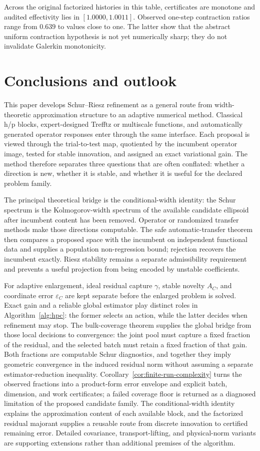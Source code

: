 \documentclass[11pt]{article}
\numberwithin{algorithm}{section}
\theoremstyle{definition}\newtheorem{definition}[theorem]{Definition}
\theoremstyle{remark}\newtheorem{remark}[theorem]{Remark}
\begin{document}
Across the original factorized histories in this table, certificates are monotone and audited effectivity
lies in $[1.0000,1.0011]$.  Observed one-step contraction ratios range from
$0.639$ to values close to one.  The latter show that the abstract uniform
contraction hypothesis is not yet numerically sharp; they do not invalidate
Galerkin monotonicity.
\endsecondarynumericsB

\section{Conclusions and outlook}
This paper develops Schur--Riesz refinement as a general route from
width-theoretic approximation structure to an adaptive numerical method.
Classical h/p blocks, expert-designed Trefftz or multiscale functions, and
automatically generated operator responses enter through the same interface.
Each proposal is viewed through the trial-to-test map, quotiented by the
incumbent operator image, tested for stable innovation, and assigned an exact
variational gain.  The method therefore separates three questions that are
often conflated: whether a direction is new, whether it is stable, and whether
it is useful for the declared problem family.

The principal theoretical bridge is the conditional-width identity: the
Schur spectrum is the Kolmogorov-width spectrum of the available candidate
ellipsoid after incumbent content has been removed.  Operator or randomized
transfer methods make those directions computable.  The safe
automatic-transfer theorem then compares a proposed space with the incumbent
on independent functional data and supplies a population non-regression bound;
rejection recovers the incumbent exactly.  Riesz stability remains a separate
admissibility requirement and prevents a useful projection from being encoded
by unstable coefficients.

For adaptive enlargement, ideal residual capture $\gamma$, stable novelty
$A_C$, and coordinate error $\varepsilon_C$ are kept separate before the
enlarged problem is solved.  Exact gain and a reliable global estimator play
distinct roles in Algorithm~\ref{alg:hpc}: the former selects an action, while
the latter decides when refinement may stop.
The bulk-coverage theorem supplies the global bridge from those local
decisions to convergence: the joint pool must capture a fixed fraction of the
residual, and the selected batch must retain a fixed fraction of that gain.
Both fractions are computable Schur diagnostics, and together they imply
geometric convergence in the induced residual norm without assuming a
separate estimator-reduction inequality.  Corollary~\ref{cor:finite-run-complexity}
turns the observed fractions into a product-form error envelope and explicit
batch, dimension, and work certificates; a failed coverage floor is returned
as a diagnosed limitation of the proposed candidate family.
The conditional-width identity explains the approximation content of each
available block, and the factorized residual majorant supplies a reusable
route from discrete innovation to certified remaining error.  Detailed
covariance, transport-lifting, and physical-norm variants are supporting
extensions rather than additional premises of the algorithm.
\end{document}

